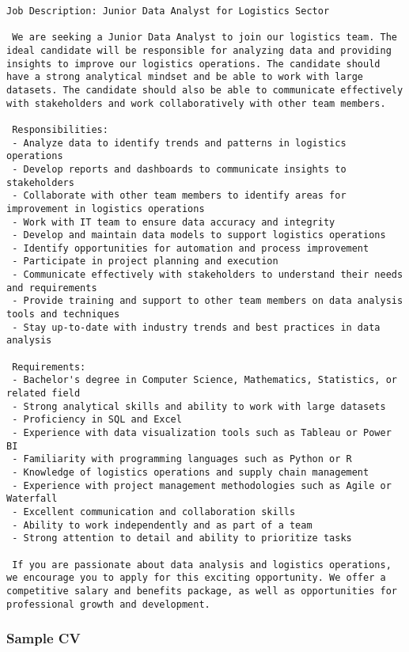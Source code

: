 \documentclass[
  letterpaper,
  DIV=11,
  numbers=noendperiod]{scrartcl}
\begin{document}
\begin{verbatim}
Job Description: Junior Data Analyst for Logistics Sector
 
 We are seeking a Junior Data Analyst to join our logistics team. The ideal candidate will be responsible for analyzing data and providing insights to improve our logistics operations. The candidate should have a strong analytical mindset and be able to work with large datasets. The candidate should also be able to communicate effectively with stakeholders and work collaboratively with other team members.
 
 Responsibilities:
 - Analyze data to identify trends and patterns in logistics operations
 - Develop reports and dashboards to communicate insights to stakeholders
 - Collaborate with other team members to identify areas for improvement in logistics operations
 - Work with IT team to ensure data accuracy and integrity
 - Develop and maintain data models to support logistics operations
 - Identify opportunities for automation and process improvement
 - Participate in project planning and execution
 - Communicate effectively with stakeholders to understand their needs and requirements
 - Provide training and support to other team members on data analysis tools and techniques
 - Stay up-to-date with industry trends and best practices in data analysis
 
 Requirements:
 - Bachelor's degree in Computer Science, Mathematics, Statistics, or related field
 - Strong analytical skills and ability to work with large datasets
 - Proficiency in SQL and Excel
 - Experience with data visualization tools such as Tableau or Power BI
 - Familiarity with programming languages such as Python or R
 - Knowledge of logistics operations and supply chain management
 - Experience with project management methodologies such as Agile or Waterfall
 - Excellent communication and collaboration skills
 - Ability to work independently and as part of a team
 - Strong attention to detail and ability to prioritize tasks
 
 If you are passionate about data analysis and logistics operations, we encourage you to apply for this exciting opportunity. We offer a competitive salary and benefits package, as well as opportunities for professional growth and development.
\end{verbatim}

\hypertarget{sample-cv}{%
\subsubsection{Sample CV}\label{sample-cv}}
\end{document}
